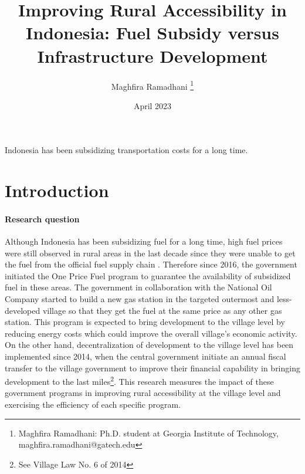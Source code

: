 \documentclass[letterpaper,12pt,leqno]{article}
\begin{document}
\title{Improving Rural Accessibility in Indonesia: Fuel Subsidy versus Infrastructure Development}
\author{Maghfira Ramadhani
\thanks{Maghfira Ramadhani: Ph.D. student at Georgia Institute of Technology, maghfira.ramadhani@gatech.edu}}
\date{April 2023}                       
\begin{titlepage}\maketitle

Indonesia has been subsidizing transportation costs for a long time.

\end{titlepage}\section{Introduction}\label{s:introduction}
 
\paragraph{Research question} Although Indonesia has been subsidizing fuel for a long time, high fuel prices were still observed in rural areas in the last decade since they were unable to get the fuel from the official fuel supply chain \citep{liputan_2016, jawapos_2017}. Therefore since 2016, the government initiated the One Price Fuel program to guarantee the availability of subsidized fuel in these areas. The government in collaboration with the National Oil Company started to build a new gas station in the targeted outermost and less-developed village so that they get the fuel at the same price as any other gas station. This program is expected to bring development to the village level by reducing energy costs which could improve the overall village's economic activity. On the other hand, decentralization of development to the village level has been implemented since 2014, when the central government initiate an annual fiscal transfer to the village government to improve their financial capability in bringing development to the last miles\footnote{See Village Law No. 6 of 2014}. This research measures the impact of these government programs in improving rural accessibility at the village level and exercising the efficiency of each specific program.
\end{document}
